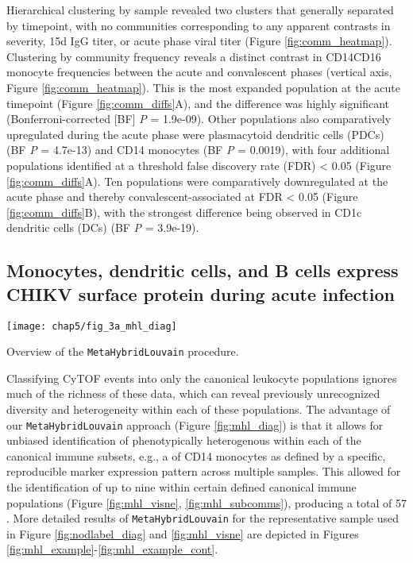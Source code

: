 Hierarchical clustering by sample revealed two clusters that generally separated by timepoint, with no communities corresponding to any apparent contrasts in severity, 15d IgG titer, or acute phase viral titer (Figure \ref{fig:comm_heatmap}). Clustering by community frequency reveals a distinct contrast in CD14\sups{+}\allowbreak CD16\sups{+} monocyte frequencies between the acute and convalescent phases (vertical axis, Figure \ref{fig:comm_heatmap}). This is the most expanded population at the acute timepoint (Figure \ref{fig:comm_diffs}A), and the difference was highly significant (Bonferroni-corrected [BF] \emph{P} = 1.9e-09). Other populations also comparatively upregulated during the acute phase were plasmacytoid dendritic cells (PDCs) (BF \emph{P} = 4.7e-13) and CD14\sups{+} monocytes (BF \emph{P} = 0.0019), with four additional populations identified at a threshold false discovery rate (FDR) < 0.05 (Figure \ref{fig:comm_diffs}A). Ten populations were comparatively downregulated at the acute phase and thereby convalescent-associated at FDR < 0.05 (Figure \ref{fig:comm_diffs}B), with the strongest difference being observed in CD1c dendritic cells (DCs) (BF \emph{P} = 3.9e-19).

\subsection{Monocytes, dendritic cells, and B cells express CHIKV surface protein during acute infection}

\begin{marginfigure}
  \centering
  \texttt{[image: chap5/fig\_3a\_mhl\_diag]}
  \vspace{1em}
  \caption[Overview of the \texttt{MetaHybridLouvain} procedure]{Overview of the \texttt{MetaHybridLouvain} procedure.}
  \label{fig:mhl_diag}
\end{marginfigure}

Classifying CyTOF events into only the canonical leukocyte populations ignores much of the richness of these data, which can reveal previously unrecognized diversity and heterogeneity within each of these populations. The advantage of our \texttt{MetaHybridLouvain} approach (Figure \ref{fig:mhl_diag}) is that it allows for unbiased identification of phenotypically heterogenous \subcommunities{} within each of the canonical immune subsets,\autocite{Samusik2016} e.g., a \subcommunity{} of CD14\sups{+} monocytes as defined by a specific, reproducible marker expression pattern across multiple samples. This allowed for the identification of up to nine \subcommunities{} within certain defined canonical immune populations (Figure \ref{fig:mhl_visne}, \ref{fig:mhl_subcomms}), producing a total of 57 \subcommunities{}. More detailed results of \texttt{MetaHybridLouvain} for the representative sample used in Figure \ref{fig:nodlabel_diag} and \ref{fig:mhl_visne} are depicted in Figures \ref{fig:mhl_example}-\ref{fig:mhl_example_cont}.

